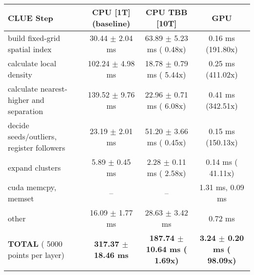     \begin{tabular}{l|c|c|c}
    \hline
    CLUE Step                                 & CPU [1T] (baseline)         & CPU TBB [10T]                         & GPU                       \\ \hline
    build fixed-grid spatial index            &  30.44 $\pm$  2.04 ms       &  63.89 $\pm$  5.23 ms ( 0.48x)        &   0.16 ms (191.80x)       \\
    calculate local density                   & 102.24 $\pm$  4.98 ms       &  18.78 $\pm$  0.79 ms ( 5.44x)        &   0.25 ms (411.02x)       \\
    calculate nearest-higher and separation   & 139.52 $\pm$  9.76 ms       &  22.96 $\pm$  0.71 ms ( 6.08x)        &   0.41 ms (342.51x)       \\
    decide seeds/outliers, register followers &  23.19 $\pm$  2.01 ms       &  51.20 $\pm$  3.66 ms ( 0.45x)        &   0.15 ms (150.13x)       \\
    expand clusters                           &   5.89 $\pm$  0.45 ms       &   2.28 $\pm$  0.11 ms ( 2.58x)        &   0.14 ms ( 41.11x)       \\ \hline
    cuda memcpy, memset                       & --                          & --                                    &   1.31 ms,   0.09 ms      \\ 
    other                                     &  16.09 $\pm$  1.77 ms       &  28.63 $\pm$  3.42 ms                 &   0.72 ms                 \\ \hline
    \textbf{TOTAL} ( 5000 points per layer)   & \textbf{317.37 $\pm$ 18.46 ms} & \textbf{187.74 $\pm$ 10.64 ms ( 1.69x)} & \textbf{  3.24 $\pm$  0.20 ms ( 98.09x)}  \\
    \hline
    \multicolumn{4}{c}{} 
    \end{tabular}
    \linebreak


